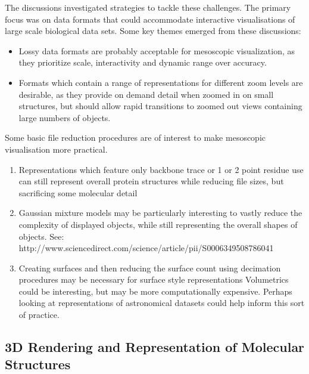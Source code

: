 \documentclass[a4paper]{article}
\begin{document}
The discussions investigated strategies to tackle these challenges. The primary focus was on data formats that could accommodate interactive visualisations of large scale biological data sets. Some key themes emerged from these discussions:
\begin{itemize}
\item Lossy data formats are probably acceptable for mesoscopic visualization, as they prioritize scale, interactivity and dynamic range over accuracy.
\item Formats which contain a range of representations for different zoom levels are desirable, as they provide on demand detail when zoomed in on small structures, but should allow rapid transitions to zoomed out views containing large numbers of objects.
\end{itemize}

Some basic file reduction procedures are of interest to make mesoscopic visualisation more practical.
\begin{enumerate}
\item Representations which feature only backbone trace or 1 or 2 point residue use can still represent overall protein structures while reducing file sizes, but sacrificing some molecular detail
\item Gaussian mixture models may be particularly interesting to vastly reduce the complexity of displayed objects, while still representing the overall shapes of objects. See: http://www.sciencedirect.com/science/article/pii/S0006349508786041
\item Creating surfaces and then reducing the surface count using decimation procedures may be necessary for surface style representations
Volumetrics could be interesting, but may be more computationally expensive. Perhaps looking at representations of astronomical datasets could help inform this sort of practice.
\end{enumerate}


\subsection{3D Rendering and Representation of Molecular Structures}
\end{document}
